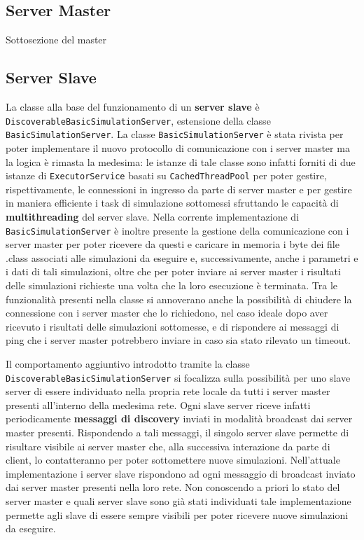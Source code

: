 \subsection{Server Master}

Sottosezione del master

\subsection{Server Slave}
La classe alla base del funzionamento di un \textbf{server slave} è \texttt{DiscoverableBasicSimulationServer}, estensione della classe \texttt{BasicSimulationServer}.
La classe \texttt{BasicSimulationServer} è stata rivista per poter implementare il nuovo protocollo di comunicazione con i server master ma la logica è rimasta la medesima:
le istanze di tale classe sono infatti forniti di due istanze di \texttt{ExecutorService} basati su \texttt{CachedThreadPool} per poter gestire, rispettivamente, le connessioni in ingresso da parte di server master
e per gestire in maniera efficiente i task di simulazione sottomessi sfruttando le capacità di \textbf{multithreading} del server slave.
Nella corrente implementazione di \texttt{BasicSimulationServer} è inoltre presente la gestione della comunicazione con i server master per poter ricevere da questi e caricare in memoria i byte dei file .class associati
alle simulazioni da eseguire e, successivamente, anche i parametri e i dati di tali simulazioni, oltre che per poter inviare ai server master i risultati delle simulazioni richieste una volta che la loro esecuzione è terminata.
Tra le funzionalità presenti nella classe si annoverano anche la possibilità di chiudere la connessione con i server master che lo richiedono, nel caso ideale dopo aver ricevuto i risultati delle simulazioni sottomesse,
e di rispondere ai messaggi di ping che i server master potrebbero inviare in caso sia stato rilevato un timeout. 

Il comportamento aggiuntivo introdotto tramite la classe \texttt{DiscoverableBasicSimulationServer} si focalizza sulla possibilità per uno slave server di essere individuato nella propria rete locale da tutti i server master
presenti all'interno della medesima rete. Ogni slave server riceve infatti periodicamente \textbf{messaggi di discovery} inviati in modalità broadcast dai server master presenti. Rispondendo a tali messaggi, il singolo server slave
permette di risultare visibile ai server master che, alla successiva interazione da parte di client, lo contatteranno per poter sottomettere nuove simulazioni.
Nell'attuale implementazione i server slave rispondono ad ogni messaggio di broadcast inviato dai server master presenti nella loro rete. Non conoscendo a priori lo stato del server master e quali server slave sono già stati individuati
tale implementazione permette agli slave di essere sempre visibili per poter ricevere nuove simulazioni da eseguire.